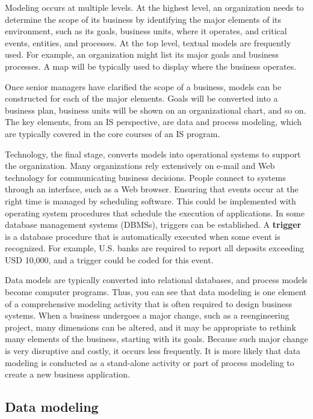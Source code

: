 \documentclass[
]{article}
\begin{document}
Modeling occurs at multiple levels. At the highest level, an
organization needs to determine the scope of its business by identifying
the major elements of its environment, such as its goals, business
units, where it operates, and critical events, entities, and processes.
At the top level, textual models are frequently used. For example, an
organization might list its major goals and business processes. A map
will be typically used to display where the business operates.

Once senior managers have clarified the scope of a business, models can
be constructed for each of the major elements. Goals will be converted
into a business plan, business units will be shown on an organizational
chart, and so on. The key elements, from an IS perspective, are data and
process modeling, which are typically covered in the core courses of an
IS program.

Technology, the final stage, converts models into operational systems to
support the organization. Many organizations rely extensively on e-mail
and Web technology for communicating business decisions. People connect
to systems through an interface, such as a Web browser. Ensuring that
events occur at the right time is managed by scheduling software. This
could be implemented with operating system procedures that schedule the
execution of applications. In some database management systems (DBMSs),
triggers can be established. A \textbf{trigger} is a database procedure that
is automatically executed when some event is recognized. For example,
U.S. banks are required to report all deposits exceeding USD 10,000, and
a trigger could be coded for this event.

Data models are typically converted into relational databases, and
process models become computer programs. Thus, you can see that data
modeling is one element of a comprehensive modeling activity that is
often required to design business systems. When a business undergoes a
major change, such as a reengineering project, many dimensions can be
altered, and it may be appropriate to rethink many elements of the
business, starting with its goals. Because such major change is very
disruptive and costly, it occurs less frequently. It is more likely that
data modeling is conducted as a stand-alone activity or part of process
modeling to create a new business application.

\hypertarget{data-modeling-1}{%
\subsection*{Data modeling}\label{data-modeling-1}}
\end{document}
